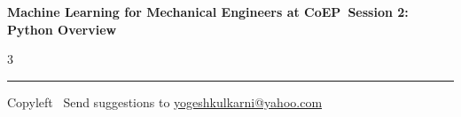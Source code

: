 \documentclass[8pt,landscape]{article}
\begin{document}
\footnotesize

\begin{center}
\Large{\textbf{Machine Learning for Mechanical Engineers at CoEP\ Session 2: Python Overview}}
\end{center}

\begin{multicols}{3}

\end{multicols}

\rule{\linewidth}{0.25pt}
\scriptsize
Copyleft \textcopyleft\  Send suggestions to
\href{http://www.yogeshkulkarni.com}{yogeshkulkarni@yahoo.com}
\end{document}
